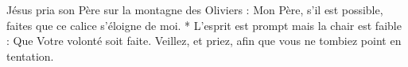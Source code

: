 Jésus pria son Père sur la montagne des Oliviers : Mon Père, s’il est possible, faites que ce calice s’éloigne de moi.
* L’esprit est prompt mais la chair est faible : Que Votre volonté soit faite.
\versseparator
Veillez, et priez, afin que vous ne tombiez point en tentation.